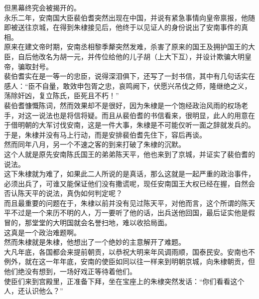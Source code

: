 \begin{multicols}{\theparacolNo}
但黑幕终究会被揭开的。\\

永乐二年，安南国大臣裴伯耆突然出现在中国，并说有紧急事情向皇帝禀报，他随即被送往京城，在得到朱棣接见后，他终于以见证人的身份说出了安南事件的真相。\\

原来在建文帝时期，安南丞相黎季犛突然发难，杀害了原来的国王及拥护国王的大臣，自后他改名为胡一元，并传位给他的儿子胡（上大下互），并设计欺骗大明皇帝，骗取封号。\\

裴伯耆实在是一等一的忠臣，说得深泪俱下，还写了一封书信，其中有几句话实在感人：“臣不自量，敢效申包胥之忠，哀鸣阙下，伏愿兴吊伐之师，隆继绝之义，荡除奸凶，复立陈氏，臣死且不朽！”\\

裴伯耆慷慨陈词，然而效果却不是很好，因为朱棣是一个饱经政治风雨的权场老手，对这一说法也是将信将疑。而且从裴伯耆的书信看来，很明显，此人的用意在于借明朝的大军讨伐安南，这是一件大事，朱棣是不可能仅听一面之辞就发兵的。于是，朱棣并没有马上行动，而是安排裴伯耆先住下，容后再谈。\\

然而同年八月，另一个不速之客的到来打破了朱棣的沉默。\\

这个人就是原先安南陈氏国王的弟弟陈天平，他也来到了京城，并证实了裴伯耆的说法。\\

这下朱棣就为难了，如果此二人所说的是真话，那么这就是一起严重的政治事件，必须出兵了，可谁又能保证他们没有撒谎呢，现任安南国王大权已经在握，自然会否认陈天平的说法，真伪如何判定呢？\\

而且最重要的问题在于，朱棣以前并没有见过陈天平，对他而言，这个所谓的陈天平不过是一个来历不明的人，万一要听了他的话，出兵送他回国，最后证实他是假冒的，那堂堂的大明国就会名誉扫地，难以收拾局面。\\

这真是一个政治难题啊。\\

然而朱棣就是朱棣，他想出了一个绝妙的主意解开了难题。\\

大凡年底，各国都会来提前朝贡，以恭祝大明来年风调雨顺，国泰民安。安南也不例外，就在这一年年底，安南的使臣如同以往一样来到明朝京城，向朱棣朝贡，但他们绝没有想到，一场好戏正等待着他们。\\

使臣们来到宫殿里，正准备下拜，坐在宝座上的朱棣突然发话：“你们看看这个人，还认识他么？”\\


\end{multicols}
